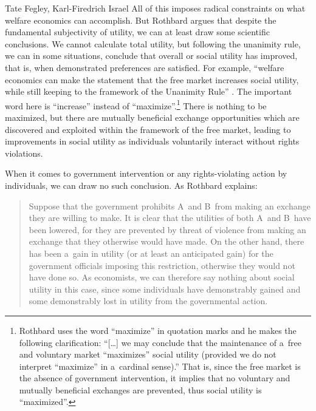 \begin{artengenv2auth}{Tate Fegley, Karl-Firedrich Israel}
All of this imposes radical constraints on what welfare economics can accomplish. But Rothbard argues that despite the fundamental subjectivity of utility, we can at least draw some scientific conclusions. We cannot calculate total utility, but following the unanimity rule, we can in some situations, conclude that overall or social utility has improved, that is, when demonstrated preferences are satisfied. For example, ``welfare economics can make the statement that the free market increases social utility, while still keeping to the framework of the Unanimity Rule'' 
\parencite[][p.320]{rothbard_toward_2011}. %
 The important word here is ``increase'' instead of ``maximize''.\footnote{Rothbard 
\parencite*[][p.323]{rothbard_conceived_2011} %
 uses the word ``maximize'' in quotation marks and he makes the following clarification: ``[…] we may conclude that the maintenance of a~free and voluntary market ``maximizes'' social utility (provided we do not interpret ``maximize'' in a~cardinal sense).'' That is, since the free market is the absence of government intervention, it implies that no voluntary and mutually beneficial exchanges are prevented, thus social utility is ``maximized''.} There is nothing to be maximized, but there are mutually beneficial exchange opportunities which are discovered and exploited within the framework of the free market, leading to improvements in social utility as individuals voluntarily interact without rights violations.



When it comes to government intervention or any rights-violating action by individuals, we can draw no such conclusion. As Rothbard 
\parencite*[][p.322]{rothbard_toward_2011} %
 explains:



\begin{quote}
Suppose that the government prohibits A~and B~from making an exchange they are willing to make. It is clear that the utilities of both A~and B~have been lowered, for they are prevented by threat of violence from making an exchange that they otherwise would have made. On the other hand, there has been a~gain in utility (or at least an anticipated gain) for the government officials imposing this restriction, otherwise they would not have done so. As economists, we can therefore say nothing about social utility in this case, since some individuals have demonstrably gained and some demonstrably lost in utility from the governmental action.
\end{quote}




\end{artengenv2auth}

